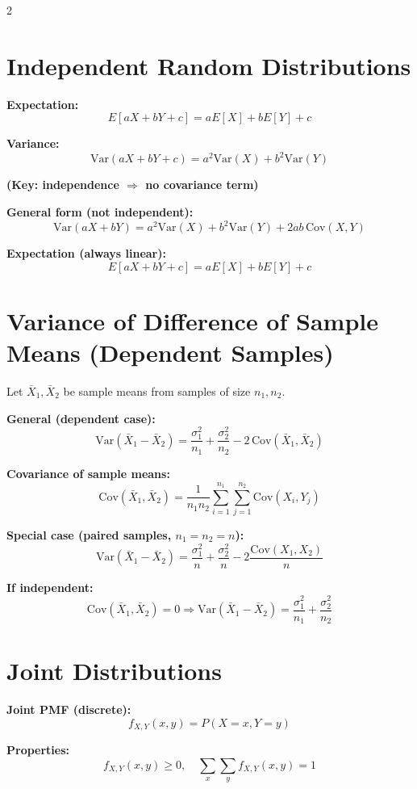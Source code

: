 \documentclass[10pt]{article}
\begin{document}
\begin{multicols}{2}

\section*{Independent Random Distributions}

\textbf{Expectation:}
\[
E[aX + bY + c] = aE[X] + bE[Y] + c
\]

\textbf{Variance:}
\[
\mathrm{Var}(aX + bY + c) = a^2 \mathrm{Var}(X) + b^2 \mathrm{Var}(Y)
\]

\textbf{(Key: independence $\Rightarrow$ no covariance term)}

\textbf{General form (not independent):}
\[
\mathrm{Var}(aX + bY) = a^2 \mathrm{Var}(X) + b^2 \mathrm{Var}(Y) + 2ab\,\mathrm{Cov}(X,Y)
\]

\textbf{Expectation (always linear):}
\[
E[aX + bY + c] = aE[X] + bE[Y] + c
\]

\section*{Variance of Difference of Sample Means (Dependent Samples)}

Let $\bar{X}_1, \bar{X}_2$ be sample means from samples of size $n_1, n_2$.

\textbf{General (dependent case):}
\[
\mathrm{Var}(\bar{X}_1 - \bar{X}_2)
=
\frac{\sigma_1^2}{n_1}
+
\frac{\sigma_2^2}{n_2}
-
2\,\mathrm{Cov}(\bar{X}_1, \bar{X}_2)
\]

\textbf{Covariance of sample means:}
\[
\mathrm{Cov}(\bar{X}_1, \bar{X}_2)
=
\frac{1}{n_1 n_2}
\sum_{i=1}^{n_1} \sum_{j=1}^{n_2}
\mathrm{Cov}(X_i, Y_j)
\]

\textbf{Special case (paired samples, $n_1 = n_2 = n$):}
\[
\mathrm{Var}(\bar{X}_1 - \bar{X}_2)
=
\frac{\sigma_1^2}{n}
+
\frac{\sigma_2^2}{n}
-
2\frac{\mathrm{Cov}(X_1, X_2)}{n}
\]

\textbf{If independent:}
\[
\mathrm{Cov}(\bar{X}_1, \bar{X}_2)=0
\Rightarrow
\mathrm{Var}(\bar{X}_1 - \bar{X}_2)
=
\frac{\sigma_1^2}{n_1}
+
\frac{\sigma_2^2}{n_2}
\]

\section*{Joint Distributions}

\textbf{Joint PMF (discrete):}
\[
f_{X,Y}(x,y) = P(X=x, Y=y)
\]

\textbf{Properties:}
\[
f_{X,Y}(x,y) \ge 0, \quad \sum_x \sum_y f_{X,Y}(x,y)=1
\]


\end{multicols}
\end{document}
